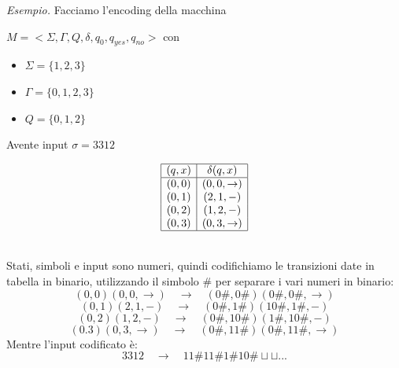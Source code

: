 \noindent \textit{Esempio.}  Facciamo l'encoding della macchina\smallskip\\
\begin{minipage}{0.45\textwidth}
    $M = <\Sigma, \Gamma,Q,\delta,q_0,q_{yes},q_{no}>$ con 
  \begin{itemize}[label=--]
    \item $\Sigma = \{ 1,2,3  \}$
    \item $\Gamma = \{0,1,2,3\}$
    \item $Q = \{ 0,1,2 \}$
\end{itemize}
Avente input $\sigma = 3312$  
\end{minipage}
\begin{minipage}{0.45\textwidth}
    \[
\begin{array}{|c|c|}
    \hline   
     (q,x) & \delta(q,x) \\
    \hline 
    (0,0) & (0,0,\to) \\
    (0,1) & (2,1,-) \\
    (0,2) & (1,2,-) \\
    (0,3) & (0,3, \to) \\
    \hline
\end{array}
    \]
\end{minipage}\smallskip\\
Stati, simboli e input sono numeri, quindi codifichiamo le transizioni date in tabella in binario, utilizzando il simbolo $\#$ 
per separare i vari numeri in binario:\\
\[  (0,0) (0,0,\to)  \quad \to \quad (0\#,0\#)(0\#,0\#,\to)   \]
\[  (0,1) (2,1,-) \quad \to \quad (0\#,1\#)(10\#,1\#,-)   \]
\[ (0,2)(1,2,-) \quad \to \quad (0\#,10\#)(1\#,10\#,-)\]
\[ (0.3)(0,3,\to)  \quad \to \quad (0\#,11\#)(0\#,11\#,\to)\]
Mentre l'input codificato è:
\[  3312 \quad \to \quad 11\#11\#1\#10\#\sqcup \sqcup ...   \]


